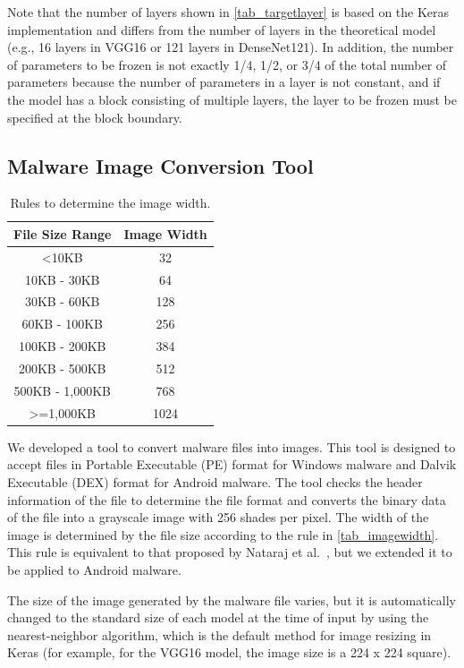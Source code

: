 \documentclass[conference]{IEEEtran}
\begin{document}
Note that the number of layers shown in \autoref{tab_targetlayer} is based on the Keras implementation and differs from the number of layers in the theoretical model (e.g., 16 layers in VGG16 or 121 layers in DenseNet121).
In addition, the number of parameters to be frozen is not exactly 1/4, 1/2, or 3/4 of the total number of parameters because the number of parameters in a layer is not constant, and if the model has a block consisting of multiple layers, the layer to be frozen must be specified at the block boundary.

\subsection{Malware Image Conversion Tool}

\begin{table}[t]
	\caption{Rules to determine the image width.}
	\label{tab_imagewidth}
	\centering
	\begin{tabular}{cc}
		\toprule
		File Size Range & Image Width\\
		\midrule
		\textless10KB    & 32 \\
		10KB   -  30KB    & 64   \\
		30KB   -  60KB    & 128  \\
		60KB   -  100KB   & 256  \\
		100KB  -  200KB   & 384  \\
		200KB  -  500KB   & 512  \\
		500KB  -  1,000KB  & 768  \\
		\textgreater=1,000KB & 1024 \\
		\bottomrule
	\end{tabular}
\end{table}

We developed a tool to convert malware files into images. 
This tool is designed to accept files in Portable Executable (PE) format for Windows malware and Dalvik Executable (DEX) format for Android malware.
The tool checks the header information of the file to determine the file format and converts the binary data of the file into a grayscale image with 256 shades per pixel. 
The width of the image is determined by the file size according to the rule in \autoref{tab_imagewidth}.
This rule is equivalent to that proposed by Nataraj et al.~\cite{10.1145/2016904.2016908}, but we extended it to be applied to Android malware. 

The size of the image generated by the malware file varies, but it is automatically changed to the standard size of each model at the time of input by using the nearest-neighbor algorithm, which is the default method for image resizing in Keras (for example, for the VGG16 model, the image size is a 224 x 224 square).
\end{document}
